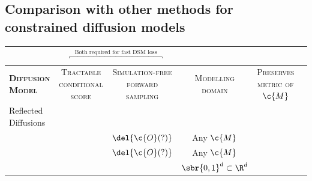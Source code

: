 \subsection{Comparison with other methods for constrained diffusion models}
\begin{table}
	\begin{tabular}{lccccc}
		                                             & \multicolumn{2}{c}{\(\overbracket{\mspace{200mu}}^{\text{Both required for fast DSM loss}}\)} &                                                                                                            \\%
		\toprule
		\scshape \bfseries Diffusion Model           & \scshape \thead{Tractable                                                                                                                                                                                  \\conditional score} & \scshape \thead{Simulation-free\\forward sampling} & \scshape \thead{Modelling                            \\domain}  & \scshape \thead{Preserves\\metric of \(\c{M}\)} \\
		\midrule
		Reflected Diffusions                                                                                                                                                                                                                                      \\
		\scshape \textcite{fishman2023diffusion_hl}  & \xmark                                                                                        & \xmark \hspace{0.1em} \(\del{\c{O}(?)}\) & Any \(\c{M}\)                                          & \cmark \\
		\scshape \textcite{fishman2023metropolis_hl} & \xmark                                                                                        & \xmark \hspace{0.1em} \(\del{\c{O}(?)}\) & Any \(\c{M}\)                                          & \cmark \\
		\scshape \textcite{lou2023reflected}         & \cmark                                                                                        & \cmark                                   & \(\sbr{0,1}^d \subset \R^d\)                           & \xmark \\


\end{tabular}
\end{table}
